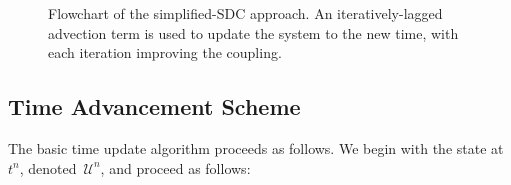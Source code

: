 \documentclass[linenumbers,trackchanges]{aastex631}
\newcommand{\castro}{{\sf Castro}}
\newcommand{\Uc}{{\,\bm{\mathcal{U}}}}
\newcommand{\Rb}{{\bf R}}
\newcommand{\Adv}[1]{{\left [\boldsymbol{\mathcal{A}} \left(#1\right)\right]}}
\newcommand{\Advs}[1]{\boldsymbol{\mathcal{A}} \left(#1\right)}
\begin{document}
\begin{figure}[t]
\caption{\label{fig:sdc_flowchart} Flowchart of the simplified-SDC
  approach.  An iteratively-lagged advection term is used to update
  the system to the new time, with each iteration improving the
  coupling.}
\end{figure}

\subsection{Time Advancement Scheme}
The basic time update algorithm proceeds as follows.
We begin with the state at $t^n$, denoted $\Uc^n$, and proceed as follows:
\end{document}
